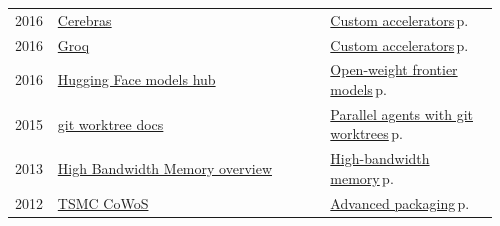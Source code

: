 \documentclass[10pt,a4paper,openany]{report}
\begin{document}
{\begin{longtable}{@{}p{0.07\linewidth}>{\raggedright}p{0.55\linewidth}>{\raggedright\arraybackslash}p{0.34\linewidth}@{}}
2016 & \href{https://www.cerebras.ai}{Cerebras} & \hyperref[c:hardware-11]{Custom accelerators}\,{\color{muted}\scriptsize p.\,\pageref{c:hardware-11}}\\
2016 & \href{https://groq.com}{Groq} & \hyperref[c:hardware-11]{Custom accelerators}\,{\color{muted}\scriptsize p.\,\pageref{c:hardware-11}}\\
2016 & \href{https://huggingface.co/models}{Hugging Face models hub} & \hyperref[c:landscape-3]{Open-weight frontier models}\,{\color{muted}\scriptsize p.\,\pageref{c:landscape-3}}\\
2015 & \href{https://git-scm.com/docs/git-worktree}{git worktree docs} & \hyperref[c:coding-6]{Parallel agents with git worktrees}\,{\color{muted}\scriptsize p.\,\pageref{c:coding-6}}\\
2013 & \href{https://en.wikipedia.org/wiki/High_Bandwidth_Memory}{High Bandwidth Memory overview} & \hyperref[c:hardware-8]{High-bandwidth memory}\,{\color{muted}\scriptsize p.\,\pageref{c:hardware-8}}\\
2012 & \href{https://3dfabric.tsmc.com/english/dedicatedFoundry/technology/cowos.htm}{TSMC CoWoS} & \hyperref[c:hardware-9]{Advanced packaging}\,{\color{muted}\scriptsize p.\,\pageref{c:hardware-9}}\\
\end{longtable}}
\end{document}
